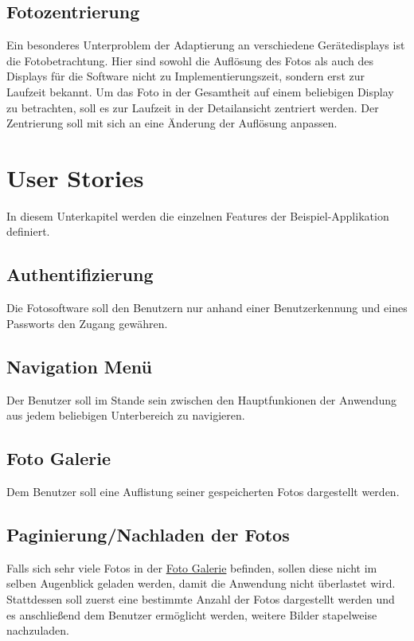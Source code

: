 \subsection{Fotozentrierung}
\label{sec:spec:photo_centering}

Ein besonderes Unterproblem der Adaptierung an verschiedene Gerätedisplays ist die Fotobetrachtung. Hier sind sowohl die Auflösung des Fotos als auch des Displays für die Software nicht zu Implementierungszeit, sondern erst zur Laufzeit bekannt. Um das Foto in der Gesamtheit auf einem beliebigen Display zu betrachten, soll es zur Laufzeit in der Detailansicht zentriert werden. Der Zentrierung soll mit sich an eine Änderung der Auflösung anpassen.

\section{User Stories}

In diesem Unterkapitel werden die einzelnen Features der Beispiel-Applikation definiert.

\subsection{Authentifizierung}
\label{sec:spec:authentication}

Die Fotosoftware soll den Benutzern nur anhand einer Benutzerkennung und eines Passworts den Zugang gewähren.

\subsection{Navigation Menü}
\label{sec:spec:menu}

Der Benutzer soll im Stande sein zwischen den Hauptfunkionen der Anwendung aus jedem beliebigen Unterbereich zu navigieren.

\subsection{Foto Galerie}
\label{sec:spec:photo_gallery}

Dem Benutzer soll eine Auflistung seiner gespeicherten Fotos dargestellt werden.

\subsection{Paginierung/Nachladen der Fotos}
\label{sec:spec:pagination}

Falls sich sehr viele Fotos in der \hyperref[sec:spec:photo_gallery]{Foto Galerie} befinden, sollen diese nicht im selben Augenblick geladen werden, damit die Anwendung nicht überlastet wird. Stattdessen soll zuerst eine bestimmte Anzahl der Fotos dargestellt werden und es anschließend dem Benutzer ermöglicht werden, weitere Bilder stapelweise nachzuladen.

